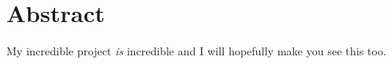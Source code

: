 \chapter*{Abstract}
\vspace{1cm}

\noindent
My incredible project \emph{is} incredible and I will hopefully make you see
this too.
